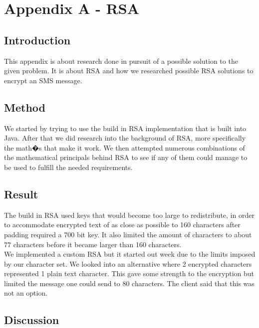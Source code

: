 \section{Appendix A - RSA}

\subsection*{Introduction}

This appendix is about research done in pursuit of a possible solution to the given problem. It is about RSA and how we researched possible RSA solutions to encrypt an SMS message.

\subsection*{Method}

We started by trying to use the build in RSA implementation that is built into Java. After that we did research into the background of RSA, more specifically the math�s that make it work. We then attempted numerous combinations of the mathematical principals behind RSA to see if any of them could manage to be used to fulfill the needed requirements.

\subsection*{Result}

The build in RSA used keys that would become too large to redistribute, in order to accommodate encrypted text of as close as possible to 160 characters after padding required a 700 bit key. It also limited the amount of characters to about 77 characters before it became larger than 160 characters.
\vspace{10pt}\\
We implemented a custom RSA but it started out week due to the limits imposed by our character set. We looked into an alternative where 2 encrypted characters represented 1 plain text character. This gave some strength to the encryption but limited the message one could send to 80 characters. The client said that this was not an option.

\subsection*{Discussion}

